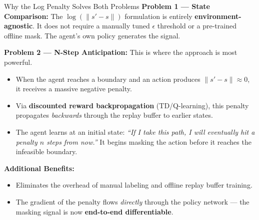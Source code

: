 \documentclass[11pt,aspectratio=169]{beamer}
\begin{document}
\begin{frame}{Why the Log Penalty Solves Both Problems}
    \textbf{Problem 1 — State Comparison:} The $\log(\|s'-s\|)$ formulation is entirely \textbf{environment-agnostic}. It does not require a manually tuned $\epsilon$ threshold or a pre-trained offline mask. The agent's own policy generates the signal.

    \vspace{0.3cm}
    \textbf{Problem 2 — N-Step Anticipation:} This is where the approach is most powerful.
    \begin{itemize}
        \item When the agent reaches a boundary and an action produces $\|s'-s\| \approx 0$, it receives a massive negative penalty.
        \item Via \textbf{discounted reward backpropagation} (TD/Q-learning), this penalty propagates \textit{backwards} through the replay buffer to earlier states.
        \item The agent learns at an initial state: \textit{``If I take this path, I will eventually hit a penalty $n$ steps from now.''} It begins masking the action before it reaches the infeasible boundary.
    \end{itemize}

    \vspace{0.2cm}
    \textbf{Additional Benefits:}
    \begin{itemize}
        \item Eliminates the overhead of manual labeling and offline replay buffer training.
        \item The gradient of the penalty flows \textit{directly} through the policy network — the masking signal is now \textbf{end-to-end differentiable}.
    \end{itemize}
\end{frame}
\end{document}
